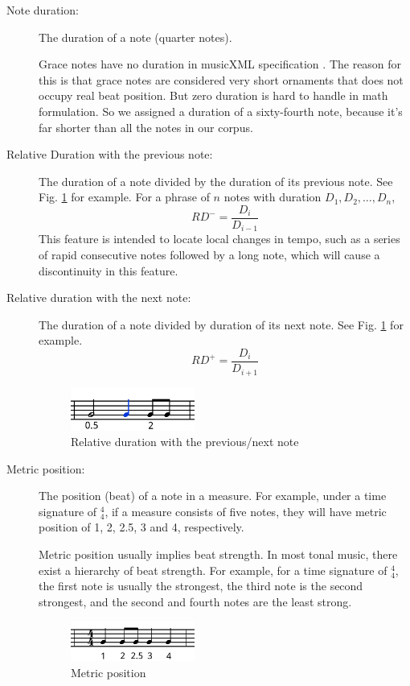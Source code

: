 \begin{description}
         
         \item [Note duration:] The duration of a note (quarter notes). 

            Grace notes have no duration in musicXML specification \cite{midispec}. The reason for this is that grace notes are considered very short ornaments that does not occupy real beat position. But zero duration is hard to handle in math formulation. So we assigned a duration of a sixty-fourth note, because it's far shorter than all the notes in our corpus.
         \item [Relative Duration with the previous note:] The duration of a note divided by the duration of its previous note. See Fig. \ref{fig:duration} for example.
For a phrase of $n$ notes with duration $D_1, D_2, \dots, D_n$, $$RD^- = \frac{D_i}{D_{i-1}} $$             This feature is intended to locate local changes in tempo, such as a series of rapid consecutive notes followed by a long note, which will cause a discontinuity in this feature.
         \item [Relative duration with the next note:] The duration of a note divided by duration of its next note. See Fig. \ref{fig:duration} for example.
$$RD^+ = \frac{D_i}{D_{i+1}} $$ 

      \begin{figure}[tp]
         \begin{center}
            \includegraphics[width=0.4\textwidth]{fig/duration}
         \end{center}
         \caption{Relative duration with the previous/next note}
         \label{fig:duration}
      \end{figure}
   \item [Metric position:] The position (beat) of a note in a measure. For example, under a time signature of $^4_4$, if a measure consists of five notes, they will have metric position of 1, 2, 2.5, 3 and 4, respectively. 
      
      Metric position usually implies beat strength. In most tonal music, there exist a hierarchy of beat strength. For example, for a time signature of $^4_4$, the first note is usually the strongest, the third note is the second strongest, and the second and fourth notes are the least strong. %

   \begin{figure}[tp]
      \begin{center}
         \includegraphics[width=0.4\textwidth]{fig/metrical}
      \end{center}
      \caption{Metric position}
      \label{fig:metrical}
   \end{figure}
      \end{description}

